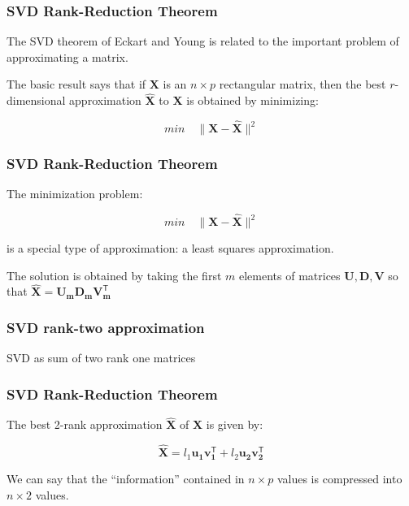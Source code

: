 \documentclass[12pt]{beamer}\usepackage[]{graphicx}\usepackage[]{color}
\begin{document}

\begin{frame}
\frametitle{SVD Rank-Reduction Theorem}

The SVD theorem of Eckart and Young is related to the important problem of 
approximating a matrix.

\bigskip
The basic result says that if $\mathbf{X}$ is an 
$n \times p$ rectangular matrix, then the best $r$-dimensional approximation 
$\hat{\mathbf{X}}$ to $\mathbf{X}$ is obtained by minimizing:

{\large
$$
min \quad \| \mathbf{X - \hat{X}} \|^2
$$
}

\end{frame}


\begin{frame}
\frametitle{SVD Rank-Reduction Theorem}

The minimization problem:

{\large
$$
min \quad \| \mathbf{X - \hat{X}} \|^2
$$
}

is a special type of approximation: a least squares approximation. 

\bigskip
The solution is obtained by taking the first $m$ elements of matrices 
$\mathbf{U, D, V}$ so that $\mathbf{\hat{X} = U_m D_m V^\mathsf{T}_m}$

\end{frame}


\begin{frame}
\frametitle{SVD rank-two approximation}
\begin{center}

{\lolit SVD as sum of two rank one matrices}
\end{center}
\end{frame}


\begin{frame}
\frametitle{SVD Rank-Reduction Theorem}

The best 2-rank approximation $\mathbf{\hat{X}}$ of $\mathbf{X}$ is given by:

{\large
$$
\mathbf{\hat{X}} = l_1 \mathbf{u_1 v^\mathsf{T}_1} + l_2 \mathbf{u_2 v^\mathsf{T}_2}
$$
}

We can say that the ``information'' contained in $n \times p$ values is compressed into 
$n \times 2$ values.

\end{frame}
\end{document}
